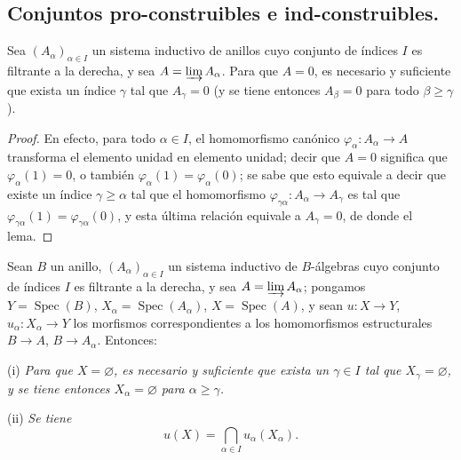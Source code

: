 \subsection{Conjuntos pro-construibles e ind-construibles.}
\label{subsection:IV.1.9-fr}

\begin{lemma}[1.9.1]
\label{IV.1.9.1-fr}
Sea $(A_\alpha)_{\alpha\in I}$ un sistema inductivo de anillos cuyo conjunto
de índices $I$ es filtrante a la derecha, y sea $A=\varinjlim A_\alpha$. Para que
$A=0$, es necesario y suficiente que exista un índice $\gamma$ tal que
$A_\gamma=0$ (y se tiene entonces $A_\beta=0$ para todo $\beta\geq\gamma$).
\end{lemma}

\begin{proof}
En efecto, para todo $\alpha\in I$, el homomorfismo canónico
$\varphi_\alpha:A_\alpha\to A$ transforma el elemento unidad en elemento unidad;
decir que $A=0$ significa que $\varphi_\alpha(1)=0$, o también
$\varphi_\alpha(1)=\varphi_\alpha(0)$; se sabe que esto equivale a decir
que existe un índice $\gamma\geq\alpha$ tal que el homomorfismo
$\varphi_{\gamma\alpha}:A_\alpha\to A_\gamma$ es tal que
$\varphi_{\gamma\alpha}(1)=\varphi_{\gamma\alpha}(0)$, y esta última
relación equivale a $A_\gamma=0$, de donde el lema.
\end{proof}

\begin{proposition}[1.9.2]
\label{IV.1.9.2-fr}
Sean $B$ un anillo, $(A_\alpha)_{\alpha\in I}$ un sistema inductivo de
$B$-álgebras cuyo conjunto de índices $I$ es filtrante a la derecha, y sea
$A=\varinjlim A_\alpha$; pongamos $Y=\operatorname{Spec}(B)$,
$X_\alpha=\operatorname{Spec}(A_\alpha)$, $X=\operatorname{Spec}(A)$, y
sean $u:X\to Y$, $u_\alpha:X_\alpha\to Y$ los morfismos correspondientes a los
homomorfismos estructurales $B\to A$, $B\to A_\alpha$. Entonces:
\end{proposition}

\label{IV.1.9.2.i-fr}%
(i) \emph{Para que $X=\varnothing$, es necesario y suficiente que exista un
$\gamma\in I$ tal que $X_\gamma=\varnothing$, y se tiene entonces
$X_\alpha=\varnothing$ para $\alpha\geq\gamma$.}\par


(ii) {\label{IV.1.9.2.ii-fr}}\emph{Se tiene}
\[
  u(X)=\bigcap_{\alpha\in I}u_\alpha(X_\alpha). \tag{1.9.2.1}
  \label{IV.1.9.2.1-fr}
\]


